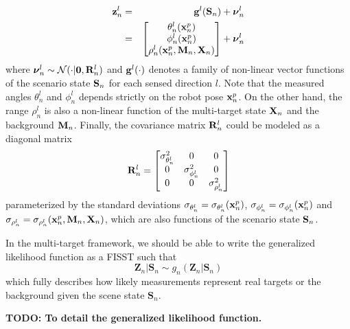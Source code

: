 \documentclass[letterpaper]{article}
\begin{document}
\begin{eqnarray}
{\bf z}^{l}_{n} &=& {\bf g}^{l}({\bf S}_{n}) + \boldsymbol{\nu}^{l}_{n} \nonumber \\
&=& 
\begin{bmatrix}
\theta^{l}_{n} ({\bf x}^{p}_{n}) \\
\phi^{l}_{n} ({\bf x}^{p}_{n}) \\
\rho^{l}_{n} ({\bf x}^{p}_{n}, {\bf M}_{n}, {\bf X}_{n})
\end{bmatrix} + \boldsymbol{\nu}^{l}_{n} 
\end{eqnarray}
\noindent where $ \boldsymbol{\nu}^{l}_{n} \sim {\cal N}(\cdot | {\bf 0}, {\bf R}^{l}_{n}) $ and $ {\bf g}^{l}(\cdot) $ denotes a family of non-linear vector functions of the scenario state $ {\bf S}_{n} $ for each sensed direction $ l $. Note that the measured angles $ \theta^{l}_{n} $ and $ \phi^{l}_{n} $ depends strictly on the robot pose $ {\bf x}^{p}_{n} $. On the other hand, the range $ \rho^{l}_{n} $ is also a non-linear function of the multi-target state $ {\bf X}_{n} $ and the background $ {\bf M}_{n} $. Finally, the covariance matrix $ {\bf R}^{l}_{n} $ could be modeled as a diagonal matrix
\begin{equation} \label{eq:R matrix}
{\bf R}^{l}_{n}=\begin{bmatrix}
\sigma_{\theta^{l}_{n}}^{2} &0 & 0 \\
0 & \sigma_{\phi^{l}_{n}}^{2} & 0 \\
0 & 0 & \sigma_{\rho^{l}_{n}}^{2}\\
\end{bmatrix}
\end{equation}
\noindent parameterized by the standard deviations $ \sigma_{\theta^{l}_{n}} = \sigma_{\theta^{l}_{n}}({\bf x}^{p}_{n}) $, $ \sigma_{\phi^{l}_{n}} = \sigma_{\phi^{l}_{n}}({\bf x}^{p}_{n}) $ and $ \sigma_{\rho^{l}_{n}} = \sigma_{\rho^{l}_{n}}({\bf x}^{p}_{n}, {\bf M}_{n}, {\bf X}_{n}) $, which are also functions of the scenario state $ {\bf S}_{n} $.

In the multi-target framework, we should be able to write the generalized likelihood function as a FISST such that
\begin{equation}
\boldsymbol{Z}_{n} | \boldsymbol{S}_{n} \sim g_{n}(\boldsymbol{Z}_{n} | \boldsymbol{S}_{n})
\end{equation}
\noindent which fully describes how likely measurements represent real targets or the background given the scene state $ \boldsymbol{S}_{n} $.

{\bf TODO: To detail the generalized likelihood function.}
\end{document}
